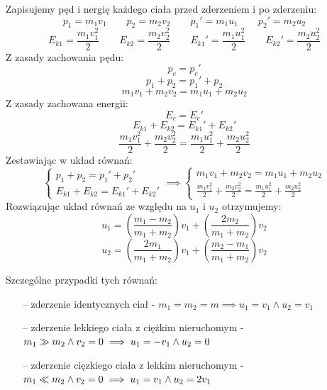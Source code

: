 \documentclass[a4paper]{article}
\begin{document}
    Zapisujemy pęd i nergię każdego ciała przed zderzeniem i po zderzeniu:
    \[p_1 = m_1v_1 \qquad p_2 = m_2v_2 \qquad p_1' = m_1u_1 \qquad p_2' = m_2u_2 \]
    \[E_{k1} = \frac{m_1v_1^2}{2} \qquad E_{k2} = \frac{m_2v_2^2}{2} \qquad
    E_{k1}' = \frac{m_1u_1^2}{2} \qquad E_{k2}' = \frac{m_2u_2^2}{2}\]
    Z zasady zachowania pędu: 
    \[p_c = p_c'\]
    \[p_1 + p_2 = p_1' + p_2\]
    \[m_1v_1 + m_2v_2 = m_1u_1 + m_2u_2\]
    Z zasady zachowana energii:
    \[E_c = E_c'\]
    \[E_{k1} + E_{k2} = E_{k1}' + E_{k2}'\]
    \[\frac{m_1v_1^2}{2} + \frac{m_2v_2^2}{2} = \frac{m_1u_1^2}{2} + \frac{m_2u_2^2}{2}\]
    Zestawiając w układ równań:
    \[
        \begin{cases}
            p_1 + p_2 = p_1' + p_2' \\
            E_{k1} + E_{k2} = E_{k1}' + E_{k2}'
        \end{cases}
        \implies
        \begin{cases}
            m_1v_1 + m_2v_2 = m_1u_1 + m_2u_2 \\
            \frac{m_1v_1^2}{2} + \frac{m_2v_2^2}{2} = \frac{m_1u_1^2}{2} + \frac{m_2u_2^2}{2}
        \end{cases}
    \]
    Rozwiązując układ równań ze względu na $u_1$ i $u_2$ otrzymujemy:
    \[u_1 = \left(\frac{m_1 - m_2}{m_1 + m_2}\right)v_1 + \left(\frac{2m_2}{m_1 + m_2}\right)v_2\]
    \[u_2 = \left(\frac{2m_1}{m_1 + m_2}\right)v_1 + \left(\frac{m_2 - m_1}{m_1 + m_2}\right)v_2\]

    Szczególne przypadki tych równań:
    \begin{itemize}
        \item[--] zderzenie identycznych ciał - $m_1 = m_2 = m \implies u_1 = v_1 \land u_2 = v_1$
        \item[--] zderzenie lekkiego ciała z ciężkim nieruchomym - $m_1 \gg m_2 \land v_2 = 0 
        \\ \implies u_1 = -v_1 \land u_2 = 0$
        \item[--] zderzenie cięzkiego ciała z lekkim nieruchomym - $m_1 \ll m_2 \land v_2 = 0 
        \\ \implies u_1 = v_1 \land u_2 = 2v_1$
    \end{itemize}

    \pagebreak
\end{document}
